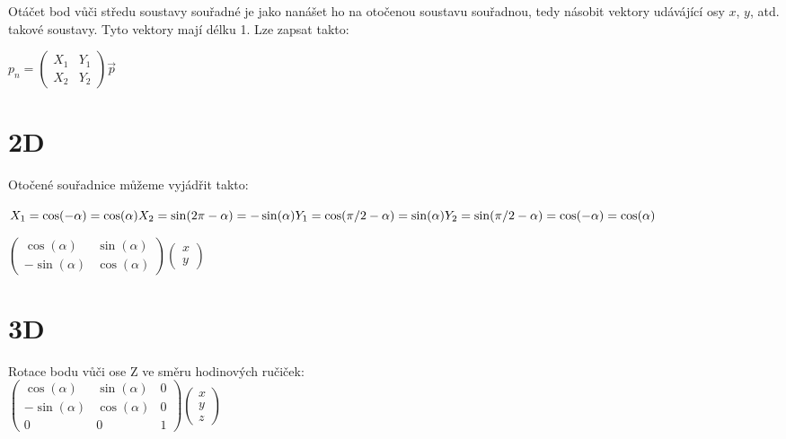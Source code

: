 \documentclass[a4paper,12pt]{report}
\begin{document}
\noindent
Otáčet bod vůči středu soustavy souřadné je jako nanášet ho na otočenou soustavu souřadnou, tedy násobit vektory udávájící osy $x$, $y$, atd. takové soustavy.
Tyto vektory mají délku 1. Lze zapsat takto:

$p_n = \begin{pmatrix}
X_1 & Y_1 \\
X_2 & Y_2
\end{pmatrix}\vec{p}$\\


\section{2D}

Otočené souřadnice můžeme vyjádřit takto:


$
X_1 = \cos(-\alpha) = \cos(\alpha)\\
X_2 = \sin(2\pi-\alpha) = -\sin(\alpha)\\
Y_1 = \cos(\pi/2 - \alpha) = \sin(\alpha)\\
Y_2 = \sin(\pi/2 - \alpha) = \cos(-\alpha) = \cos(\alpha)
$



$\begin{pmatrix}
\cos(\alpha) & \sin(\alpha)\\
-\sin(\alpha) & \cos(\alpha)
\end{pmatrix}\begin{pmatrix}x\\y\end{pmatrix}$



\section{3D}






Rotace bodu vůči ose Z ve směru hodinových ručiček:\\
$\begin{pmatrix}
\cos(\alpha) & \sin(\alpha) & 0\\
-\sin(\alpha) & \cos(\alpha) & 0\\
0 & 0 & 1
\end{pmatrix}\begin{pmatrix}x\\y\\z\end{pmatrix}$\\
\end{document}
